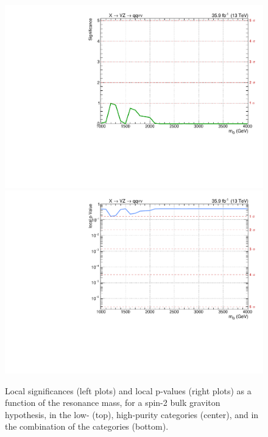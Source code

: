 \begin{figure}[!htb]
\begin{center}
     \includegraphics[width=.495\textwidth]{plotsAlpha_tesi/Limits/Significance_XZZInv_XVZnn.pdf}%
     \includegraphics[width=.495\textwidth]{plotsAlpha_tesi/Limits/pValue_XZZInv_XVZnn.pdf}

  \end{center}
  \caption{Local significances (left plots) and local p-values (right plots) as a function of the resonance mass, for a spin-2 bulk graviton hypothesis, in the low- (top), high-purity categories (center), and in the combination of the categories (bottom).}
  \label{fig:Signif_XZZInv}
\end{figure}

